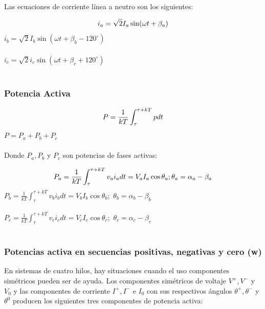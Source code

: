 Las ecuaciones de corriente línea a neutro son los siguientes:

\begin{equation}\label{EQ41}
i_{a}=\sqrt{2}I_{a}\sin(\omega t+\beta_{a})\\
\end{equation}
$i_{b}=\sqrt{2}I_{b}\sin(\omega t+\beta_{b} -120^{\circ})$\\\\
$i_{c}=\sqrt{2}i_{c}\sin(\omega t+\beta_{c}+120^{\circ})$\\\\

\subsubsection{Potencia Activa}

\begin{equation}\label{EQ42}
P=\frac{1}{kT}\int_{\tau}^{\tau +kT}pdt\\
\end{equation}
$P=P_{a}+P_{b}+P_{c}$\\\\

Donde $P_{a},P_{b}$ y $P_{c}$ son potencias de fases activas:

\begin{equation}\label{EQ43}
P_{a}=\frac{1}{kT}\int_{\tau}^{\tau +kT}v_{a}i_{a}dt=V_{a}I_{a}\cos\theta_{a};\\ \theta_{a}=\alpha_{a}-\beta_{a}\\
\end{equation}
$P_{b}=\frac{1}{kT}\int_{\tau}^{\tau +kT}v_{b}i_{b}dt=V_{b}I_{b}\cos\theta_{b};$ \hspace{1.5cm} $\theta_{b}=\alpha_{b}-\beta_{b}$\\\\
$P_{c}=\frac{1}{kT}\int_{\tau}^{\tau +kT}v_{c}i_{c}dt=V_{c}I_{c}\cos\theta_{c};$ \hspace{1.5cm} $\theta_{c}=\alpha_{c}-\beta_{c}$\\\\


\subsubsection{Potencias activa en secuencias positivas, negativas y cero (w)}

En sistemas de cuatro hilos, hay situaciones cuando el uso componentes simétricos pueden ser de ayuda. Los componentes simétricos de voltaje $V^{+},V^{-}$ y $V_{0}$ y las componentes de corriente $I^{+},I^{-}$  e $I_{0}$ con sus respectivos ángulos $\theta^{+},\theta^{-}$ y $\theta^{0}$ producen los siguientes tres componentes de potencia activa:\cite{A30}\\

